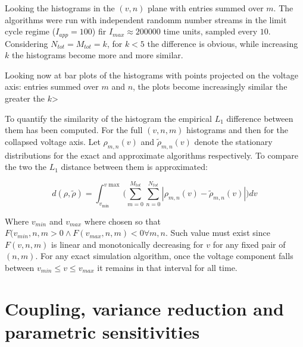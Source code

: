 Looking the histograms in the $(v, n)$ plane with entries summed over $m$.
The algorithms were run with independent randomm number streams in the limit cycle regime ($I_{app} = 100$) fir $I_{max} \approx 200000$ time units, sampled every $10$.
Considering $N_{tot} = M_{tot} = k$, for $k<5$ the difference is obvious, while increasing $k$ the histograms become more and more similar.

Looking now at bar plots of the histograms with points projected on the voltage axis: entries summed over $m$ and $n$, the plots become increasingly similar the greater the $k$>

To quantify the similarity of the histogram the empirical $L_1$ difference between them has been computed.
For the full $(v, n, m)$ histograms and then for the collapsed voltage axis.
Let $\rho_{m,n}(v)$ and $\tilde{\rho}_{m, n}(v)$ denote the stationary distributions for the exact and approximate algorithms respectively.
To compare the two the $L_1$ distance between them is approximated:

$$d(\rho,\tilde{\rho}) = \int_{v_{\min}}^{v{\max}}\biggl(\sum\limits_{m=0}^{M_{tot}}\sum\limits_{n=0}^{N_{tot}}|\rho_{m, n}(v)-\tilde{\rho}_{m,n}(v)|\biggr)dv$$

Where $v_{min}$ and $v_{max}$ where chosen so that $F(v_{min}, n, m>0\land F(v_{max}, n, m)<0\forall m,n$.
Such value must exist since $F(v,n,m)$ is linear and monotonically decreasing for $v$ for any fixed pair of $(n,m)$.
For any exact simulation algorithm, once the voltage component falls between $v_{min}\le v \le v_{max}$ it remains in that interval for all time.

\section{Coupling, variance reduction and parametric sensitivities}





